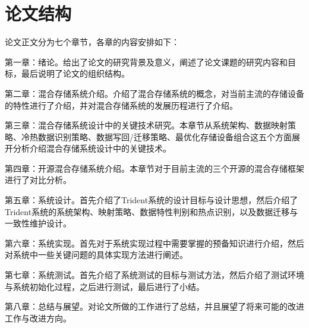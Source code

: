 \section{论文结构}

论文正文分为七个章节，各章的内容安排如下： 

第一章：绪论。给出了论文的研究背景及意义，阐述了论文课题的研究内容和目标，最后说明了论文的组织结构。 

第二章：混合存储系统介绍。介绍了混合存储系统的概念，对当前主流的存储设备的特性进行了介绍，并对混合存储系统的发展历程进行了介绍。 

第三章：混合存储系统设计中的关键技术研究。本章节从系统架构、数据映射策略、冷热数据识别策略、数据写回/迁移策略、最优化存储设备组合这五个方面展开分析介绍混合存储系统设计中的关键技术。 

第四章：开源混合存储系统介绍。本章节对于目前主流的三个开源的混合存储框架进行了对比分析。

第五章：系统设计。首先介绍了Trident系统的设计目标与设计思想，然后介绍了Trident系统的系统架构、映射策略、数据特性判别和热点识别，以及数据迁移与一致性维护设计。 

第六章：系统实现。首先对于系统实现过程中需要掌握的预备知识进行介绍，然后对系统中一些关键问题的具体实现方法进行阐述。 

第七章：系统测试。首先介绍了系统测试的目标与测试方法，然后介绍了测试环境与系统初始化过程，之后进行测试，最后进行了小结。 

第八章：总结与展望。对论文所做的工作进行了总结，并且展望了将来可能的改进工作与改进方向。

